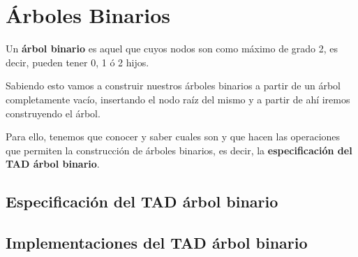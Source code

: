 \chapter{Árboles Binarios}
Un \textbf{árbol binario} es aquel que cuyos nodos son como máximo de grado 2, es decir, pueden tener 0, 1 ó 2 hijos.

Sabiendo esto vamos a construir nuestros árboles binarios a partir de un árbol completamente vacío, insertando el nodo raíz del mismo y a partir de ahí iremos construyendo el árbol.

Para ello, tenemos que conocer y saber cuales son y que hacen las operaciones que permiten la construcción de árboles binarios, es decir, la \textbf{especificación del TAD árbol binario}.

\section{Especificación del TAD árbol binario}

\newpage
\section{Implementaciones del TAD árbol binario}


